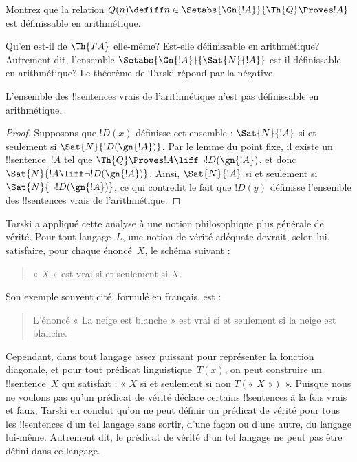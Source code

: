 \documentclass[../../../include/open-logic-section]{subfiles}
\begin{document}
\begin{prob}
Montrez que la relation
$Q(n)\defiff n\in
\Setabs{\Gn{!A}}{\Th{Q}\Proves !A}$
est définissable en arithmétique.
\end{prob}

Qu'en est-il de $\Th{TA}$ elle-même?
Est-elle définissable en arithmétique?
Autrement dit, l'ensemble
$\Setabs{\Gn{!A}}{\Sat{N}{!A}}$
est-il définissable en arithmétique?
Le théorème de Tarski répond par la négative.

\begin{thm}
L'ensemble des !!{sentence}s vrais de
l'arithmétique n'est pas définissable en
arithmétique.
\end{thm}

\begin{proof}
Supposons que $!D(x)$ définisse cet ensemble :
$\Sat{N}{!A}$ si et seulement si
$\Sat{N}{!D(\gn{!A})}$. Par le lemme du point
fixe, il existe un !!{sentence}~$!A$ tel que
$\Th{Q}\Proves !A\liff\lnot !D(\gn{!A})$,
et donc
$\Sat{N}{!A\liff\lnot !D(\gn{!A})}$.
Ainsi, $\Sat{N}{!A}$ si et seulement si
$\Sat{N}{\lnot !D(\gn{!A})}$, ce qui contredit
le fait que $!D(y)$ définisse l'ensemble des
!!{sentence}s vrais de l'arithmétique.
\end{proof}

Tarski a appliqué cette analyse à une notion
philosophique plus générale de vérité. Pour tout
langage~$L$, une notion de vérité adéquate devrait,
selon lui, satisfaire, pour chaque énoncé~$X$, le
schéma suivant :
\begin{quote}
« $X$ » est vrai si et seulement si $X$.
\end{quote}
Son exemple souvent cité, formulé en français, est :
\begin{quote}
L'énoncé « La neige est blanche » est vrai si et
seulement si la neige est blanche.
\end{quote}
Cependant, dans tout langage assez puissant pour
représenter la fonction diagonale, et pour tout
prédicat linguistique~$T(x)$, on peut construire
un !!{sentence}~$X$ qui satisfait :
« $X$ si et seulement si non
$T(\text{« $X$ »})$ ».
Puisque nous ne voulons pas qu'un prédicat de
vérité déclare certains !!{sentence}s à la fois
vrais et faux, Tarski en conclut qu'on ne peut
définir un prédicat de vérité pour tous les
!!{sentence}s d'un tel langage sans sortir, d'une
façon ou d'une autre, du langage lui-même.
Autrement dit, le prédicat de vérité d'un tel langage
ne peut pas être défini dans ce langage.
\end{document}
